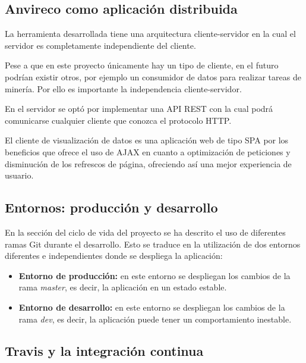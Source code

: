 \subsection{Anvireco como aplicación distribuida}

La herramienta desarrollada tiene una arquitectura cliente-servidor en la cual el servidor es completamente independiente del cliente.

Pese a que en este proyecto únicamente hay un tipo de cliente, en el futuro podrían existir otros, por ejemplo un consumidor de datos para realizar tareas de minería. Por ello es importante la independencia cliente-servidor.


En el servidor se optó por implementar una API REST con la cual podrá comunicarse cualquier cliente que conozca el protocolo HTTP.

El cliente de visualización de datos es una aplicación web de tipo SPA por los beneficios que ofrece el uso de AJAX en cuanto a optimización de peticiones y disminución de los refrescos de página, ofreciendo así una mejor experiencia de usuario.


\subsection{Entornos: producción y desarrollo}

En la sección del ciclo de vida del proyecto se ha descrito el uso de diferentes ramas Git durante el desarrollo. Esto se traduce en la utilización de dos entornos diferentes e independientes donde se despliega la aplicación:

\begin{itemize}
	\item \textbf{Entorno de producción:} en este entorno se despliegan los cambios de la rama \textit{master}, es decir, la aplicación en un estado estable.
	\item \textbf{Entorno de desarrollo:} en este entorno se despliegan los cambios de la rama \textit{dev}, es decir, la aplicación puede tener un comportamiento inestable.
\end{itemize}



\subsection{Travis y la integración continua}

